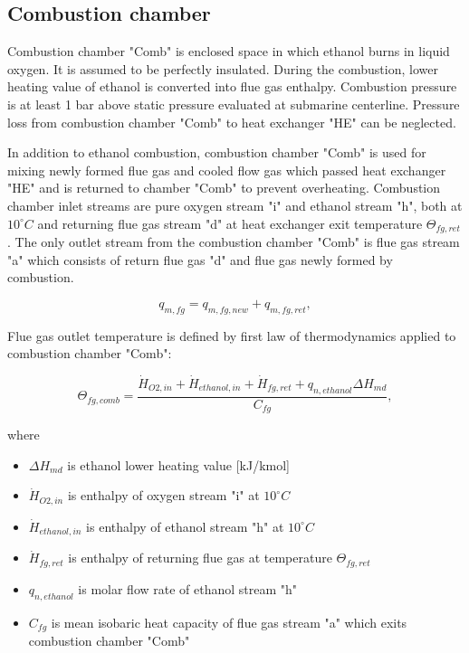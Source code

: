 \documentclass{article}
\begin{document}
	\subsection*{Combustion chamber}
	
	Combustion chamber "Comb" is enclosed space in which ethanol burns in liquid oxygen. It is assumed to be perfectly insulated. During the combustion, lower heating value of ethanol is converted into flue gas enthalpy. Combustion pressure is at least 1 bar above static pressure evaluated at submarine centerline. Pressure loss from combustion chamber "Comb" to heat exchanger "HE" can be neglected.
	
	In addition to ethanol combustion, combustion chamber "Comb" is used for mixing newly formed flue gas and cooled flow gas which passed heat exchanger "HE" and is returned to chamber "Comb" to prevent overheating. Combustion chamber inlet streams are pure oxygen stream "i" and ethanol stream "h", both at $10^{\circ}C$ and returning flue gas stream "d" at heat exchanger exit temperature  $\Theta_{fg,ret}$. The only outlet stream from the combustion chamber "Comb" is flue gas stream "a" which consists of return flue gas "d" and flue gas newly formed by combustion. 
	
	\begin{equation}\label{eq:flue_gas_stream_new}
		q_{m,fg} = q_{m,fg,new} + q_{m,fg,ret},
	\end{equation}
	
	\noindent
	Flue gas outlet temperature is defined by first law of thermodynamics applied to combustion chamber "Comb":
	
	\begin{equation}\label{eq:flue_gas_out_temp}
		\Theta_{fg,comb} = \frac{\dot{H}_{O2,in} + \dot{H}_{ethanol,in} +\dot{H}_{fg,ret} + q_{n,ethanol} \Delta H_{md}}{C_{fg}},
	\end{equation}
	
	\noindent
	where
	
	\begin{itemize}
		\item $\Delta H_{md}$ is ethanol lower heating value [kJ/kmol]
		\item $\dot{H}_{O2,in}$ is enthalpy of oxygen stream "i" at $10^\circ C$
		\item $\dot{H}_{ethanol,in}$ is enthalpy of ethanol stream "h" at $10^\circ C$
		\item $\dot{H}_{fg,ret}$ is enthalpy of returning flue gas at temperature $\Theta_{fg,ret}$
		\item $q_{n,ethanol}$ is molar flow rate of ethanol stream "h"
		\item $C_{fg}$ is mean isobaric heat capacity of flue gas stream "a" which exits combustion chamber "Comb"
	\end{itemize}
\end{document}
